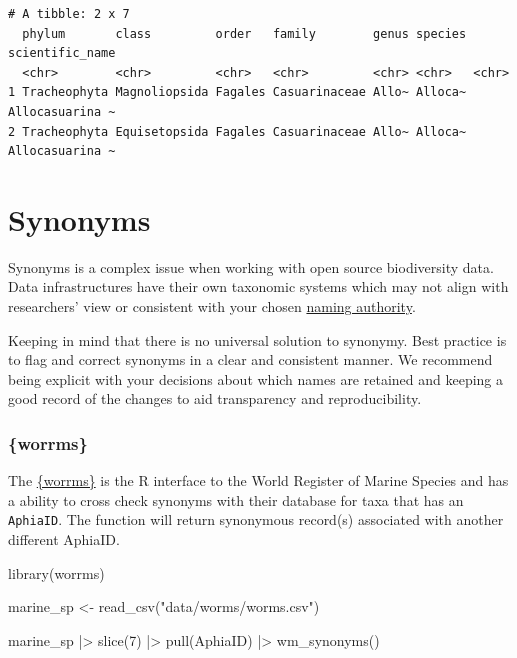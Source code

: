 \documentclass[
  letterpaper,
  DIV=11,
  numbers=noendperiod,
  oneside]{scrreprt}
\newenvironment{Shaded}{\begin{snugshade}}{\end{snugshade}}
\newcommand{\DecValTok}[1]{\textcolor[rgb]{0.68,0.00,0.00}{#1}}
\newcommand{\FunctionTok}[1]{\textcolor[rgb]{0.28,0.35,0.67}{#1}}
\newcommand{\NormalTok}[1]{\textcolor[rgb]{0.00,0.23,0.31}{#1}}
\newcommand{\OtherTok}[1]{\textcolor[rgb]{0.00,0.23,0.31}{#1}}
\newcommand{\SpecialCharTok}[1]{\textcolor[rgb]{0.37,0.37,0.37}{#1}}
\newcommand{\StringTok}[1]{\textcolor[rgb]{0.13,0.47,0.30}{#1}}
\begin{document}
\begin{verbatim}
# A tibble: 2 x 7
  phylum       class         order   family        genus species scientific_name
  <chr>        <chr>         <chr>   <chr>         <chr> <chr>   <chr>          
1 Tracheophyta Magnoliopsida Fagales Casuarinaceae Allo~ Alloca~ Allocasuarina ~
2 Tracheophyta Equisetopsida Fagales Casuarinaceae Allo~ Alloca~ Allocasuarina ~
\end{verbatim}

\hypertarget{synonyms}{%
\section{Synonyms}\label{synonyms}}

Synonyms is a complex issue when working with open source biodiversity
data. Data infrastructures have their own taxonomic systems which may
not align with researchers' view or consistent with your chosen
\href{link_back}{naming authority}.

Keeping in mind that there is no universal solution to synonymy. Best
practice is to flag and correct synonyms in a clear and consistent
manner. We recommend being explicit with your decisions about which
names are retained and keeping a good record of the changes to aid
transparency and reproducibility.

\hypertarget{worrms}{%
\subsubsection*{\{worrms\}}\label{worrms}}

The \href{https://docs.ropensci.org/worrms/}{\{worrms\}} is the R
interface to the World Register of Marine Species and has a ability to
cross check synonyms with their database for taxa that has an
\texttt{AphiaID}. The function will return synonymous record(s)
associated with another different AphiaID.

\begin{Shaded}
\begin{Highlighting}[]
\FunctionTok{library}\NormalTok{(worrms)}

\NormalTok{marine\_sp }\OtherTok{\textless{}{-}} \FunctionTok{read\_csv}\NormalTok{(}\StringTok{"data/worms/worms.csv"}\NormalTok{)}

\NormalTok{marine\_sp }\SpecialCharTok{|\textgreater{}} 
  \FunctionTok{slice}\NormalTok{(}\DecValTok{7}\NormalTok{) }\SpecialCharTok{|\textgreater{}}
  \FunctionTok{pull}\NormalTok{(AphiaID) }\SpecialCharTok{|\textgreater{}} 
  \FunctionTok{wm\_synonyms}\NormalTok{()}
\end{Highlighting}
\end{Shaded}
\end{document}
